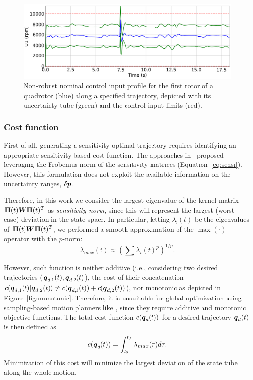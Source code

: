 \begin{figure} [t]
    \centering
    \includegraphics[width=0.8\linewidth]{figures/samp/Invalid_Inputs.png} 
    \caption{Non-robust nominal control input profile for the first rotor of a quadrotor (blue) along a specified trajectory, depicted with its uncertainty tube (green) and the control input limits (red).}%
    \label{fig:invalid_inputs}%
\end{figure}

\subsubsection{Cost function}\label{sec:sensi_cost}

First of all, generating a sensitivity-optimal trajectory requires identifying an appropriate sensitivity-based cost function.
The approaches in~\cite{cPi, cTh} proposed leveraging the Frobenius norm of the sensitivity matrices (Equation~\ref{eq:sensi}).
However, this formulation does not exploit the available information on the uncertainty ranges, $\delta \boldsymbol{p}$.

Therefore, in this work we consider the largest eigenvalue of the kernel matrix $\boldsymbol{\Pi}(t) \boldsymbol{W} \boldsymbol{\Pi}(t)^T$ as \emph{sensitivity norm}, since this will represent the largest (worst-case) deviation in the state space. 
In particular, letting $\lambda_i(t)$ be the eigenvalues of $\boldsymbol{\Pi}(t) \boldsymbol{W} \boldsymbol{\Pi}(t)^T$, we performed a smooth approximation of the $\max(\cdot)$ operator with the $p$-norm:
\begin{equation}
    \lambda_{max}(t)\approx \left(\sum \lambda_{i}(t)^p\right)^{1/p}.
\end{equation} 

However, such function is neither additive (i.e., considering two desired trajectories ($\boldsymbol{q}_{d,1}(t), \boldsymbol{q}_{d,2}(t)$), the cost of their concatenation $c(\boldsymbol{q}_{d,1}(t)|\boldsymbol{q}_{d,2}(t)) \neq c(\boldsymbol{q}_{d,1}(t)) + c(\boldsymbol{q}_{d,2}(t))$), nor monotonic as depicted in Figure~\ref{fig:monotonic}.
Therefore, it is unsuitable for global optimization using sampling-based motion planners like \cite{cRRTstar, cSST}, since they require additive and monotonic objective functions.
The total cost function $c(\boldsymbol{q}_d(t))$ for a desired trajectory $\boldsymbol{q}_d(t)$ is then defined as
\begin{equation} \label{eq:cost_function}
    c(\boldsymbol{q}_d(t))=\int_{t_{0}}^{t_{f}}\lambda_{max}(\tau)d\tau.
\end{equation}
Minimization of this cost will minimize the largest deviation of the state tube along the whole motion.

